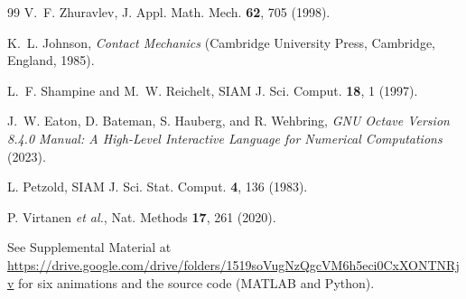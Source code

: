 \documentclass[aps,pre,twocolumn,superscriptaddress,amsmath,amssymb,floatfix,nofootinbib]{revtex4-2}
\newcommand{\supp}{https://drive.google.com/drive/folders/1519soVugNzQgcVM6h5eci0CxXONTNRjv}
\begin{document}
\begin{thebibliography}{99}
 V.~F. Zhuravlev, J. Appl. Math. Mech. \textbf{62}, 705 (1998).

 K.~L. Johnson, \textit{Contact Mechanics} (Cambridge University
Press, Cambridge, England, 1985).

 L.~F. Shampine and M.~W. Reichelt, SIAM J. Sci. Comput.
\textbf{18}, 1 (1997).

 J.~W. Eaton, D. Bateman, S. Hauberg, and R. Wehbring,
\textit{GNU Octave Version 8.4.0 Manual: A High-Level Interactive Language for Numerical
Computations} (2023).

 L. Petzold, SIAM J. Sci. Stat. Comput. \textbf{4}, 136 (1983).

 P. Virtanen \textit{et al.}, Nat. Methods \textbf{17}, 261 (2020).

 See Supplemental Material at \url{\supp} for six animations and the source
code (MATLAB and Python).

\end{thebibliography}
\end{document}
